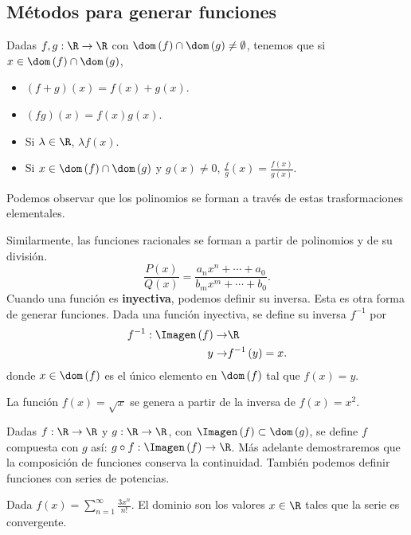 \subsection{Métodos para generar funciones}
 Dadas $\displaystyle f, g : \R \to \R $ con $\displaystyle \dom\left(f\right) \cap \dom\left(g\right) \neq \emptyset $, tenemos que si $\displaystyle x \in \dom\left(f\right) \cap \dom\left(g\right) $,
\begin{itemize}
\item $\displaystyle \left(f+g\right)\left(x\right) = f\left(x\right) + g\left(x\right) $.
\item $\displaystyle \left(fg\right)\left(x\right) = f\left(x\right)g\left(x\right) $.
\item Si $\displaystyle \lambda \in \R $, $\displaystyle \lambda f\left(x\right) $.
\item Si $\displaystyle x \in \dom\left(f\right) \cap \dom\left(g\right) $ y $\displaystyle g\left(x\right) \neq 0 $, $\displaystyle \frac{f}{g}\left(x\right) = \frac{f\left(x\right)}{g\left(x\right)} $.
\end{itemize}
\begin{observation}
\normalfont Podemos observar que los polinomios se forman a través de estas trasformaciones elementales.
\end{observation}
Similarmente, las funciones racionales se forman a partir de polinomios y de su división.
\[\frac{P\left(x\right)}{Q\left(x\right)} = \frac{a_{n}x^{n} + \cdots + a_{0}}{b_{m}x^{m} + \cdots + b_{0}} .\]
Cuando una función es \textbf{inyectiva}, podemos definir su inversa. Esta es otra forma de generar funciones. Dada una función inyectiva, se define su inversa $\displaystyle f^{-1} $ por
\[
\begin{split}
	f^{-1} : \Imagen\left(f\right) \to & \R \\
	y \to & f^{-1}\left(y\right) = x.
\end{split}
\]
donde $\displaystyle x \in \dom\left(f\right) $ es el único elemento en $\displaystyle \dom\left(f\right) $ tal que $\displaystyle f\left(x\right) =y $.
\begin{eg}
\normalfont La función $\displaystyle f\left(x\right) = \sqrt{x} $ se genera a partir de la inversa de $\displaystyle f\left(x\right) = x^{2} $.
\end{eg}
Dadas $\displaystyle f : \R \to \R $ y $\displaystyle g : \R \to \R $, con $\displaystyle \Imagen\left(f\right) \subset \dom\left(g\right) $, se define $\displaystyle f $ compuesta con $\displaystyle g $ así: $\displaystyle g \circ f : \Imagen\left(f\right) \to \R $. Más adelante demostraremos que la composición de funciones conserva la continuidad. También podemos definir funciones con series de potencias.
\begin{eg}
\normalfont Dada $\displaystyle f\left(x\right) = \sum^{\infty}_{n = 1}\frac{3x^{n}}{n!} $. El dominio son los valores $\displaystyle x \in \R $ tales que la serie es convergente.
\end{eg}

